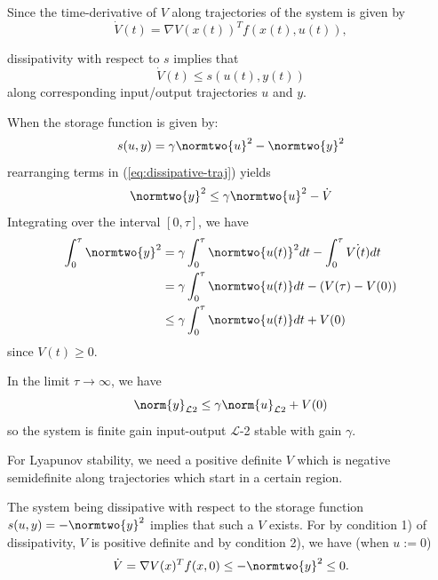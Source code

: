 \documentclass{homework}
\renewcommand{\L}{\mathcal{L}}
\begin{document}
\begin{letterenum}
\item Since the time-derivative of $V$ along trajectories of
    the system is given by
    \begin{equation*}
        \dot{V}(t) = \nabla V(x(t))^T f(x(t), u(t)),
    \end{equation*}

    dissipativity with respect to $s$ implies that
    \begin{equation}
        \dot{V}(t) \leq s(u(t), y(t))
        \label{eq:dissipative-traj}
    \end{equation}
    along corresponding input/output trajectories $u$ and $y$.

    When the storage function is given by:
    \begin{equation}
        s(u, y) = \gamma \normtwo{u}^2 - \normtwo{y}^2
        \label{eq:l2-storage}
    \end{equation}
    rearranging terms in (\ref{eq:dissipative-traj}) yields
    \begin{equation*}
        \normtwo{y}^2 \leq \gamma \normtwo{u}^2 - \dot{V}
    \end{equation*}
    Integrating over the interval $[0, \tau]$, we have
    \begin{align*}
        \int_{0}^{\tau} \normtwo{y}^2 &= \gamma \int_{0}^{\tau} \normtwo{u(t)}^2 dt
                - \int_{0}^{\tau} \dot{V(t)}dt \\
            &= \gamma \int_{0}^{\tau} \normtwo{u(t)} dt - (V(\tau) - V(0)) \\
            &\leq \gamma \int_{0}^{\tau} \normtwo{u(t)} dt + V(0)
    \end{align*}
    since $V(t) \geq 0$.

    In the limit $\tau \to \infty$, we have
    \begin{equation*}
        \norm{y}_{\L 2} \leq \gamma \norm{u}_{\L 2} + V(0)
    \end{equation*}
    so the system is finite gain input-output $\L$-2 stable
    with gain $\gamma$.

\item For Lyapunov stability, we need a positive definite
$V$ which is negative semidefinite along trajectories which 
start in a certain region.

The system being dissipative with respect to the storage function
$s(u, y) = -\normtwo{y}^2$ implies that such a $V$ exists. For
by condition 1) of dissipativity, $V$ is positive definite and 
by condition 2), we have (when $u := 0$)
\begin{equation*}
    \dot{V} = \nabla V(x)^T f(x, 0) \leq -\normtwo{y}^2 \leq 0.
\end{equation*}


\end{letterenum}
\end{document}
